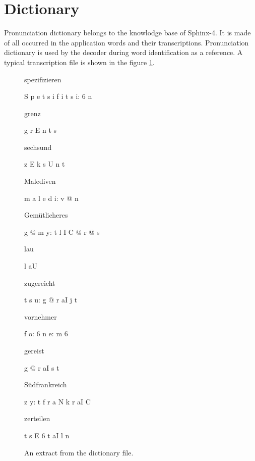 \section {Dictionary} 

Pronunciation dictionary belongs to the knowlodge base of Sphinx-4. It is made
of all occurred in the application words and their transcriptions. Pronunciation dictionary is used by the decoder during word identification as a reference. 
A typical transcription file is shown in the figure \ref {fig:dic}.
\newline
\begin{figure}[htbp]
%  
%  

spezifizieren	\begin{IPA} S p e t s i f i t s i: 6 n  \end{IPA}
\newline grenz	\begin{IPA}g r E n t s \end{IPA}
\newline sechsund	\begin{IPA}z E k s U n t\end{IPA}
\newline Malediven	\begin{IPA}m a l e d i: v @ n\end{IPA}
\newline Gemütlicheres	\begin{IPA}g @ m y: t l I C @ r @ s\end{IPA}
\newline lau	\begin{IPA}l aU\end{IPA}
\newline zugereicht	\begin{IPA}t s u: g @ r aI j t\end{IPA}
\newline vornehmer	\begin{IPA}f o: 6 n e: m 6\end{IPA}
\newline gereist	\begin{IPA}g @ r aI s t\end{IPA}
\newline Südfrankreich	\begin{IPA}z y: t f r a N k r aI C\end{IPA}
\newline zerteilen	\begin{IPA}t s E 6 t aI l n\end{IPA}
 \caption{An extract from the dictionary file.}
  \label{fig:dic}
\end {figure}
